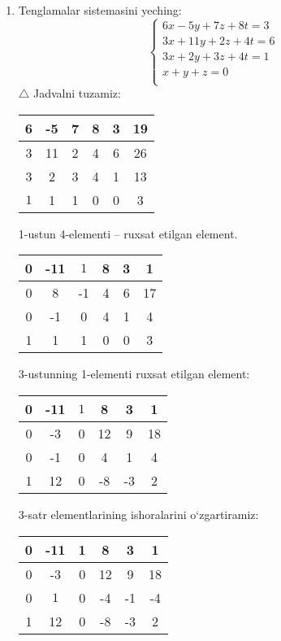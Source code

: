 \begin{enumerate}
\item Tenglamalar sistemasini yeching:
$$\begin{cases}
	6x-5y+7z+8t=3\\
	3x+11y+2z+4t=6\\ 
	3x+2y+3z+4t=1\\
	x+y+z=0\\
\end{cases}$$
$\triangle$ Jadvalni tuzamiz:
\begin{center}
	\begin{tabular}{|c|c|c|c|c|c|}
		\hline
		6&-5&7&8&3&19\\ \hline
		3&11&2&4&6&26\\ \hline
		3&2&3&4&1&13\\ \hline
		$\boxed{1}$&1&1&0&0&3\\ \hline
	\end{tabular}
\end{center}
1-ustun 4-elementi -- ruxsat etilgan element.
\begin{center}
\begin{tabular}{|c|c|c|c|c|c|}
	\hline
	0&-11&$\boxed{1}$&8&3&1\\ \hline
	0&8&-1&4&6&17\\ \hline
	0&-1&0&4&1&4\\ \hline
	1&1&1&0&0&3\\ \hline
\end{tabular}
\end{center}
3-ustunning 1-elementi ruxsat etilgan element:
\begin{center}
	\begin{tabular}{|c|c|c|c|c|c|}
		\hline
		0&-11&$\boxed{1}$&8&3&1\\ \hline
		0&-3&0&12&9&18\\ \hline
		0&-1&0&4&1&4\\ \hline
		1&12&0&-8&-3&2\\ \hline
	\end{tabular}
\end{center}
3-satr elementlarining ishoralarini o`zgartiramiz:
\begin{center}
	\begin{tabular}{|c|c|c|c|c|c|}
		\hline
		0&-11&1&8&3&1\\ \hline
		0&-3&0&12&9&18\\ \hline
		0&$\boxed{1}$&0&-4&-1&-4\\ \hline
		1&12&0&-8&-3&2\\ \hline
	\end{tabular}
\end{center}

\end{enumerate}
